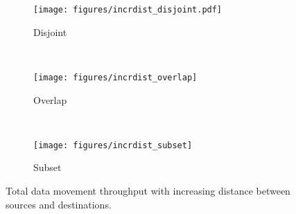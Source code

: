 \begin{figure*}[!htbp]
        \centering
        \begin{subfigure}[b]{0.32\textwidth}
                \texttt{[image: figures/incrdist\_disjoint.pdf]}
                \caption{Disjoint}
                \label{fig:incrdist_disjoint}
        \end{subfigure}%
        ~ %
        \begin{subfigure}[b]{0.32\textwidth}
                \texttt{[image: figures/incrdist\_overlap]}
                \caption{Overlap}
                \label{fig:incrdist_overlap}
        \end{subfigure}
        ~ %
        \begin{subfigure}[b]{0.32\textwidth}
                \texttt{[image: figures/incrdist\_subset]}
                \caption{Subset}
                \label{fig:incrdist_subset}
        \end{subfigure}
        \caption{\small Total data movement throughput with increasing distance between sources and destinations.}
	\vspace{-0.15in}
        \label{fig:incrdist}
\end{figure*}

